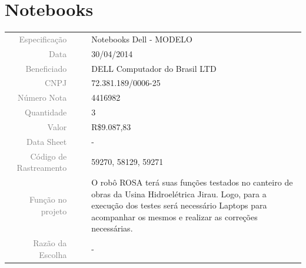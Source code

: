 




\section{Notebooks}
\label{notebook}


\begin{table}[ht!]

	\begin{tabular}{r l|l p{12cm} }
		
		\textcolor{gray}{Especificação} &&& 	{Notebooks Dell - MODELO}\\
		\textcolor{gray}{Data} &&& 				{30/04/2014}\\
        \textcolor{gray}{Beneficiado} &&&		{DELL Computador do Brasil LTD} \\
        \textcolor{gray}{CNPJ} &&& 				{72.381.189/0006-25} \\
        \textcolor{gray}{Número Nota} &&& 		{4416982} \\
		\textcolor{gray}{Quantidade} &&& 		{3} \\
		\textcolor{gray}{Valor} &&& 			{R\$9.087,83} \\
		\textcolor{gray}{Data Sheet} &&& 		{-} \\
		\textcolor{gray}{Código de Rastreamento} &&& {59270, 58129, 59271}\\

		\textcolor{gray}{Função no projeto} &&& {O robô ROSA terá suas funções testados no canteiro de obras da Usina Hidroelétrica Jirau. Logo, para a execução dos testes será necessário Laptops para acompanhar os mesmos e realizar as correções necessárias.  } \\
		\textcolor{gray}{Razão da Escolha} &&& {-}
		
	\end{tabular}
\end{table}

\newpage

